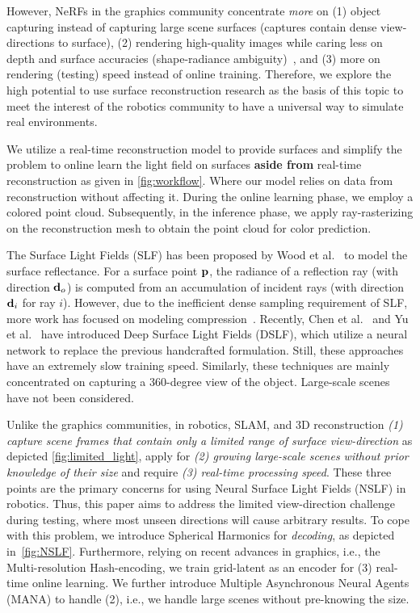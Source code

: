 However, NeRFs in the graphics community concentrate \emph{more} on (1) object capturing instead of capturing large scene surfaces (captures contain dense view-directions to surface), (2) rendering high-quality images while caring less on depth and surface accuracies (shape-radiance ambiguity)~\cite{zhang2020nerf++}, and (3) more on rendering (testing) speed instead of online training.
%
Therefore, we explore the high potential to use surface reconstruction research as the basis of this topic to meet the interest of the robotics community to have a universal way to simulate real environments.

We utilize a real-time reconstruction model to provide surfaces and simplify the problem to online learn the light field on surfaces \textbf{aside from} real-time reconstruction as given in \cref{fig:workflow}. Where our model relies on data from reconstruction without affecting it. During the online learning phase, we employ a colored point cloud. Subsequently, in the inference phase, we apply ray-rasterizing on the reconstruction mesh to obtain the point cloud for color prediction.

The Surface Light Fields (SLF) has been proposed by Wood et al.~\cite{wood2000surface} to model the surface reflectance.
For a surface point $\mathbf p$, the radiance of a reflection ray (with direction $\mathbf d_o$) is computed from an accumulation of incident rays (with direction $\mathbf d_i$ for ray $i$).
However, due to the inefficient dense sampling requirement of SLF, more work has focused on modeling compression~\cite{miandji2013learning}. 
Recently, Chen et al.~\cite{chen2018deep} and Yu et al.~\cite{yu2022anisotropic} have introduced Deep Surface Light Fields (DSLF), which utilize a neural network to replace the previous handcrafted formulation.
%
Still, these approaches have an extremely slow training speed. 
Similarly, these techniques are mainly concentrated on capturing a 360-degree view of the object.%
Large-scale scenes have not been considered.

Unlike the graphics communities, in robotics, SLAM, and 3D reconstruction \emph{(1) capture scene frames that contain only a limited range of surface view-direction} as depicted \cref{fig:limited_light}, apply for \emph{(2) growing large-scale scenes without prior knowledge of their size} and require \emph{(3) real-time processing speed}.
These three points are the primary concerns for using Neural Surface Light Fields (NSLF) in robotics.
%
Thus, this paper aims to address the limited view-direction challenge during testing, where most unseen directions will cause arbitrary results.
To cope with this problem, we introduce Spherical Harmonics for \emph{decoding}, as depicted in~\cref{fig:NSLF}.
Furthermore, relying on recent advances in graphics, i.e., the Multi-resolution Hash-encoding, we train grid-latent as an encoder for (3) real-time online learning.
%
We further introduce Multiple Asynchronous Neural Agents (MANA) to handle (2), i.e., we handle large scenes without pre-knowing the size. 

